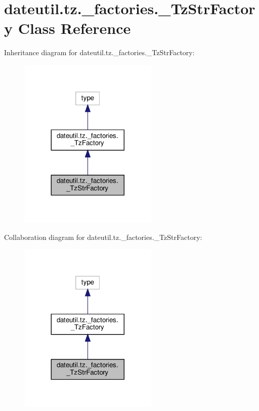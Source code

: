 \hypertarget{classdateutil_1_1tz_1_1__factories_1_1__TzStrFactory}{}\section{dateutil.\+tz.\+\_\+factories.\+\_\+\+Tz\+Str\+Factory Class Reference}
\label{classdateutil_1_1tz_1_1__factories_1_1__TzStrFactory}


Inheritance diagram for dateutil.\+tz.\+\_\+factories.\+\_\+\+Tz\+Str\+Factory\+:
\nopagebreak
\begin{figure}[H]
\begin{center}
\leavevmode
\includegraphics[width=188pt]{classdateutil_1_1tz_1_1__factories_1_1__TzStrFactory__inherit__graph}
\end{center}
\end{figure}


Collaboration diagram for dateutil.\+tz.\+\_\+factories.\+\_\+\+Tz\+Str\+Factory\+:
\nopagebreak
\begin{figure}[H]
\begin{center}
\leavevmode
\includegraphics[width=188pt]{classdateutil_1_1tz_1_1__factories_1_1__TzStrFactory__coll__graph}
\end{center}
\end{figure}
